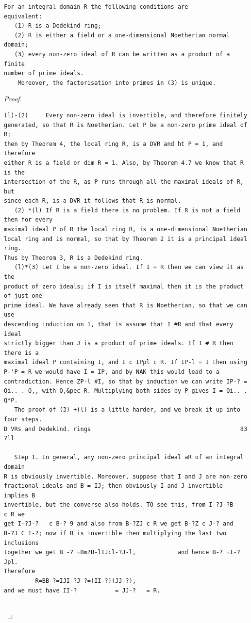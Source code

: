 \begin{theorem}\label{mcrt-auto-theorem-11-6}\uses{}
\begin{verbatim}
For an integral domain R the following conditions are
equivalent:
   (1) R is a Dedekind ring;
   (2) R is either a field or a one-dimensional Noetherian normal domain;
   (3) every non-zero ideal of R can be written as a product of a finite
number of prime ideals.
    Moreover, the factorisation into primes in (3) is unique.
\end{verbatim}
\end{theorem}
\begin{proof}
\begin{verbatim}
(l)-(2)     Every non-zero ideal is invertible, and therefore finitely
generated, so that R is Noetherian. Let P be a non-zero prime ideal of R;
then by Theorem 4, the local ring R, is a DVR and ht P = 1, and therefore
either R is a field or dim R = 1. Also, by Theorem 4.7 we know that R is the
intersection of the R, as P runs through all the maximal ideals of R, but
since each R, is a DVR it follows that R is normal.
   (2) *(l) If R is a field there is no problem. If R is not a field then for every
maximal ideal P of R the local ring R, is a one-dimensional Noetherian
local ring and is normal, so that by Theorem 2 it is a principal ideal ring.
Thus by Theorem 3, R is a Dedekind ring.
   (l)*(3) Let I be a non-zero ideal. If I = R then we can view it as the
product of zero ideals; if I is itself maximal then it is the product of just one
prime ideal. We have already seen that R is Noetherian, so that we can use
descending induction on 1, that is assume that I #R and that every ideal
strictly bigger than J is a product of prime ideals. If I # R then there is a
maximal ideal P containing I, and I c IPpl c R. If IP-l = I then using
P-'P = R we would have I = IP, and by NAK this would lead to a
contradiction. Hence ZP-l #I, so that by induction we can write IP-? =
Qi.. . Q,, with Q,&pec R. Multiplying both sides by P gives I = Qi.. . Q*P.
   The proof of (3) +(l) is a little harder, and we break it up into four steps.
D VRs and Dedekind. rings                                           83
?ll

   Step 1. In general, any non-zero principal ideal aR of an integral domain
R is obviously invertible. Moreover, suppose that I and J are non-zero
fractional ideals and B = IJ; then obviously I and J invertible implies B
invertible, but the converse also holds. TO see this, from I-?J-?B    c R we
get I-?J-?   c B-? 9 and also from B-?ZJ c R we get B-?Z c J-? and
B-?J C I-?; now if B is invertible then multiplying the last two inclusions
together we get B -? =Bm?B-lIJcl-?J-l,            and hence B-? =I-?Jpl.
Therefore
         R=BB-?=IJI-?J-?=(II-?)(JJ-?),
and we must have II-?           = JJ-?   = R.


\end{verbatim}
\end{proof}
